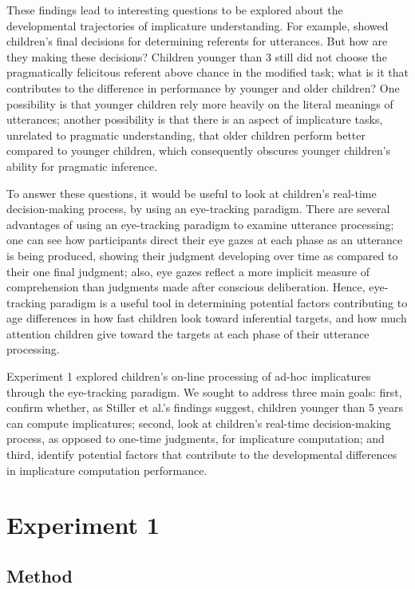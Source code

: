 \documentclass[10pt,letterpaper]{article}
\begin{document}
These findings lead to interesting questions to be explored about the developmental trajectories of implicature understanding. For example,  showed children's final decisions for determining referents for utterances. But how are they making these decisions? Children younger than 3 still did not choose the pragmatically felicitous referent above chance in the modified task; what is it that contributes to the difference in performance by younger and older children? One possibility is that younger children rely more heavily on the literal meanings of utterances; another possibility is that there is an aspect of implicature tasks, unrelated to pragmatic understanding, that older children perform better compared to younger children, which consequently obscures younger children's ability for pragmatic inference. 

To answer these questions, it would be useful to look at children's real-time decision-making process, by using an eye-tracking paradigm. There are several advantages of using an eye-tracking paradigm to examine utterance processing; one can see how participants direct their eye gazes at each phase as an utterance is being produced, showing their judgment developing over time as compared to their one final judgment; also, eye gazes reflect a more implicit measure of comprehension than judgments made after conscious deliberation. Hence, eye-tracking paradigm is a useful tool in determining potential factors contributing to age differences in how fast children look toward inferential targets, and how much attention children give toward the targets at each phase of their utterance processing.

Experiment 1 explored children's on-line processing of ad-hoc implicatures through the eye-tracking paradigm. We sought to address three main goals: first, confirm whether, as Stiller et al.'s findings suggest, children younger than 5 years can compute implicatures; second, look at children's real-time decision-making process, as opposed to one-time judgments, for implicature computation; and third, identify potential factors that contribute to the developmental differences in implicature computation performance.

\section{Experiment 1}

\subsection{Method}
\end{document}
